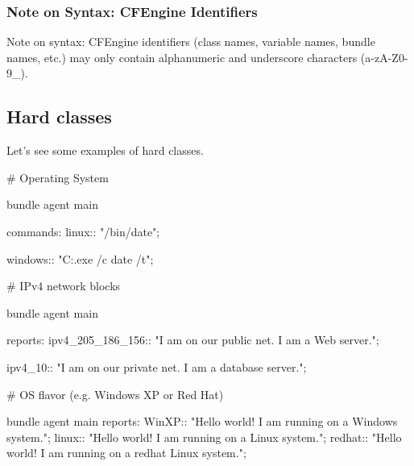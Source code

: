 \subsubsection{Note on Syntax: CFEngine Identifiers}

Note on syntax: CFEngine identifiers (class names, variable names, bundle
names, etc.) may only contain alphanumeric and underscore characters (a-zA-Z0-9\_).





\subsection{Hard classes}

Let's see some examples of hard classes.

\begin{codelisting}
\begin{code}
# Operating System

bundle agent main
{
  commands:
    linux::
      "/bin/date";

    windows::
      "C:\Windows{}\cmd.exe /c date /t";
}
\end{code}
\end{codelisting}
\begin{codelisting}
\begin{code}
# IPv4 network blocks

bundle agent main
{
  reports:
    ipv4_205_186_156::
      "I am on our public net. I am a Web server.";

    ipv4_10::
      "I am on our private net. I am a database server.";
}
\end{code}
\end{codelisting}
\begin{codelisting}
\begin{code}
# OS flavor (e.g. Windows XP or Red Hat)

bundle agent main
{
  reports:
    WinXP:: "Hello world! I am running on a Windows system.";
    linux:: "Hello world! I am running on a Linux system.";
    redhat:: "Hello world! I am running on a redhat Linux system.";
}
\end{code}
\end{codelisting}
